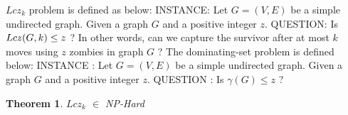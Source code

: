 \documentclass[1p]{elsarticle}
\newtheorem{theorem}{Theorem}
\newcommand{\zn}{\ooalign{$z$\cr\hfil\rule[.5ex]{.2em}{.08ex}\hfil\cr}}
\begin{document}
	$Lcz_k$ problem is defined as below:
	{\newline}
	INSTANCE: Let $G = (V,E)$ be a simple undirected graph. Given a graph $G$ and a positive integer $z$.
	{\newline}
	QUESTION: Is $Lc\zn(G,k) \leq z$ ? In other words, can we capture the survivor after at most $k$ moves using $z$ zombies in graph $G$ ?
	{\newline}
	{\newline}
	The dominating-set problem is defined below:
	{\newline}
	INSTANCE : Let $G = (V,E)$ be a simple undirected graph. Given a graph $G$ and a positive integer $z$.
	{\newline}
	QUESTION : Is $\gamma(G) \leq z$ ?

	\begin{theorem}
		$Lcz_k$ $\in$ NP-Hard
	\end{theorem}
\end{document}
